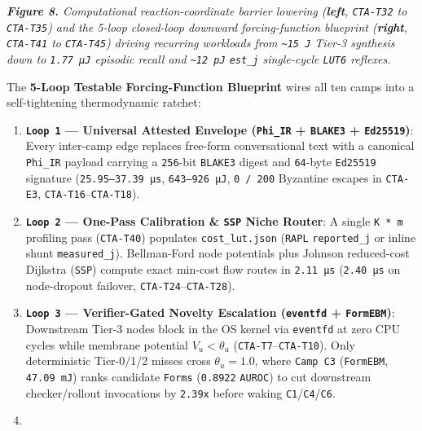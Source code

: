 \documentclass[10pt,letterpaper]{article}
\providecommand{\tightlist}{\setlength{\itemsep}{1pt}\setlength{\parskip}{0pt}}
\begin{document}
\emph{\textbf{Figure 8.} Computational reaction-coordinate barrier
lowering (\textbf{left}, \texttt{CTA-T32} to \texttt{CTA-T35}) and the
5-loop closed-loop downward forcing-function blueprint (\textbf{right},
\texttt{CTA-T41} to \texttt{CTA-T45}) driving recurring workloads from
\texttt{\textasciitilde{}15\ J} Tier-3 synthesis down to
\texttt{1.77\ µJ} episodic recall and \texttt{\textasciitilde{}12\ pJ}
\texttt{est\_j} single-cycle \texttt{LUT6} reflexes.}

The \textbf{5-Loop Testable Forcing-Function Blueprint} wires all ten
camps into a self-tightening thermodynamic ratchet:

\begin{enumerate}
\def\labelenumi{\arabic{enumi}.}
\tightlist
\item
  \textbf{\texttt{Loop\ 1} --- Universal Attested Envelope
  (\texttt{Phi\_IR} + \texttt{BLAKE3} + \texttt{Ed25519})}: Every
  inter-camp edge replaces free-form conversational text with a
  canonical \texttt{Phi\_IR} payload carrying a \texttt{256}-bit
  \texttt{BLAKE3} digest and \texttt{64}-byte \texttt{Ed25519} signature
  (\texttt{25.\allowbreak{}95–37.\allowbreak{}39\ µs}, \texttt{643–926\ µJ}, \texttt{0\ /\ 200}
  Byzantine escapes in \texttt{CTA-E3},
  \texttt{CTA-T16}--\texttt{CTA-T18}).
\item
  \textbf{\texttt{Loop\ 2} --- One-Pass Calibration \& \texttt{SSP}
  Niche Router}: A single \texttt{K\ *\ m} profiling pass
  (\texttt{CTA-T40}) populates \texttt{cost\_\allowbreak{}lut.\allowbreak{}json} (\texttt{RAPL}
  \texttt{reported\_\allowbreak{}j} or inline shunt \texttt{measured\_\allowbreak{}j}).
  Bellman-Ford node potentials plus Johnson reduced-cost Dijkstra
  (\texttt{SSP}) compute exact min-cost flow routes in \texttt{2.11\ µs}
  (\texttt{2.40\ µs} on node-dropout failover,
  \texttt{CTA-T24}--\texttt{CTA-T28}).
\item
  \textbf{\texttt{Loop\ 3} --- Verifier-Gated Novelty Escalation
  (\texttt{eventfd} + \texttt{FormEBM})}: Downstream Tier-3 nodes block
  in the OS kernel via \texttt{eventfd} at zero CPU cycles while
  membrane potential \(V_u < \theta_u\)
  (\texttt{CTA-T7}--\texttt{CTA-T10}). Only deterministic Tier-0/1/2
  misses cross \(\theta_u = 1.0\), where \texttt{Camp\ C3}
  (\texttt{FormEBM}, \texttt{47.09\ mJ}) ranks candidate \texttt{Forms}
  (\texttt{0.8922} \texttt{AUROC}) to cut downstream checker/rollout
  invocations by \texttt{2.39x} before waking
  \texttt{C1}/\allowbreak{}\texttt{C4}/\allowbreak{}\texttt{C6}.
\item

\end{enumerate}
\end{document}
